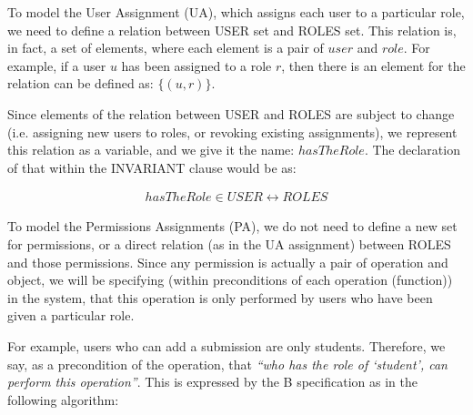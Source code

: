 To model the User Assignment (UA), which assigns each user to a particular role, we need to define a relation between USER set and ROLES set.  This relation is, in fact, a set of elements, where each element is a pair of $user$ and $role$.  For example, if a user $u$ has been assigned to a role $r$, then there is an element for the relation can be defined as: $\{(u, r)\}$.

Since elements of the relation between USER and ROLES are subject to change (i.e. assigning new users to roles, or revoking existing assignments), we represent this relation as a variable, and we give it the name: $hasTheRole$.  The declaration of that within the INVARIANT clause would be as: 

\begin{align*}
hasTheRole \in USER \leftrightarrow ROLES
\end{align*}


To model the Permissions Assignments (PA), we do not need to define a new set for permissions, or a direct relation (as in the UA assignment) between ROLES and those permissions.  Since any permission is actually a pair of operation and object, we will be specifying (within preconditions of each operation (function)) in the system, that this operation is only performed by users who have been given a particular role.

For example, users who can add a submission are only students.  Therefore, we say, as a precondition of the operation, that \textit{“who has the role of ‘student’, can perform this operation”}.  This is expressed by the B specification as in the following algorithm:

